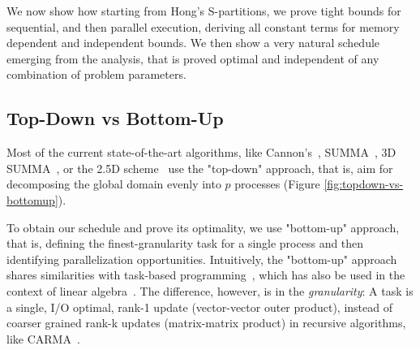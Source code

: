\documentclass[sigplan,review,anonymous]{acmart}\settopmatter{printfolios=true,printccs=false,printacmref=false}
\begin{document}
We now show how starting from Hong's S-partitions, we prove tight bounds for
sequential, and then parallel execution, deriving all constant terms for memory
dependent and independent bounds. We then show a very natural schedule emerging
from the analysis, that is proved optimal and independent of any combination of
problem parameters. 

\subsection{Top-Down vs Bottom-Up}

Most of the current state-of-the-art algorithms, like Cannon's~\cite{Cannon},
SUMMA~\cite{summa}, 3D SUMMA~\cite{summa3d}, or the 2.5D scheme~\cite{25d}
use the "top-down" approach, that is, aim for decomposing the global domain
evenly into $p$ processes (Figure \ref{fig:topdown-vs-bottomup}).

To obtain our schedule and prove its optimality, we use "bottom-up" approach,
that is, defining the finest-granularity task for a single process and then
identifying parallelization opportunities.  Intuitively, the "bottom-up"
approach shares similarities with task-based programming~\cite{taskparalelism},
which has also be used in the context of linear algebra~\cite{taskMMM}. The
difference, however, is in the \emph{granularity}: A task is a single, I/O
optimal, rank-1 update (vector-vector outer product), instead of coarser grained
rank-k updates (matrix-matrix product) in recursive algorithms, like
CARMA~\cite{CARMA}.
%
\end{document}
